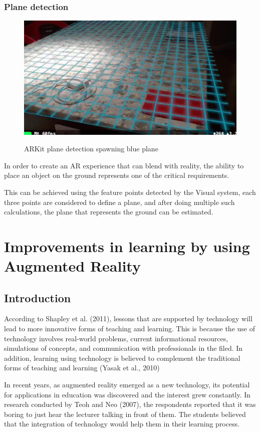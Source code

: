 \documentclass[12 pct]{report}
\begin{document}
\subsection*{Plane detection}
\begin{figure}[H]
\includegraphics[width=1\textwidth]{plane-detection}
\centering
\label{fig:plane-detection}
\caption{ARKit plane detection spawning blue plane}
\end{figure}

In order to create an AR experience that can blend with reality, the ability to place an object on the ground represents one of the critical requirements. 

This can be achieved using the feature points detected by the Visual system, each three points are considered to define a plane, and after doing multiple such calculations, the plane that represents the ground can be estimated.

\chapter{Improvements in learning by using Augmented Reality}
\section{Introduction}
According to Shapley et al. (2011), lessons that are supported by technology will lead to more innovative forms of teaching and learning. This is because the use of technology involves real-world problems, current informational resources, simulations of concepts, and communication with professionals in the filed. In addition, learning using technology is believed to complement the traditional forms of teaching and learning (Yasak et al., 2010)

In recent years, as augmented reality emerged as a new technology, its potential for applications in education was discovered and the interest grew constantly. In research conducted by Teoh and Neo (2007), the respondents reported that it was boring to just hear the lecturer talking in front of them. The students believed that the integration of technology would help them in their learning process. 
\end{document}
